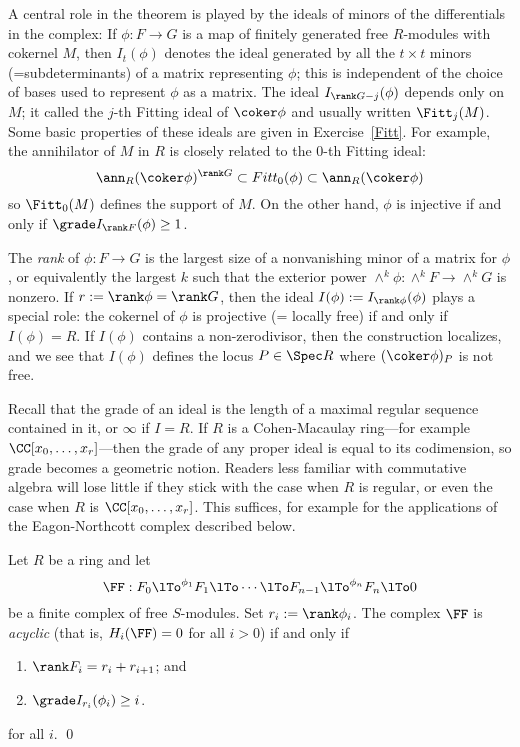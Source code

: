 A central role in the theorem is played by the ideals of minors of the differentials in the complex: If $\phi: F\to G$ is a map of finitely generated free $R$-modules with cokernel $M$, then
$I_t(\phi)$ denotes the ideal generated by all the $t\times t$ minors (=subdeterminants) of a matrix representing $\phi$; this is independent of the choice of bases used to represent $\phi$ as a matrix.
The ideal $I_{\rank G -j}(\phi)$ depends only on $M$; it called the $j$-th Fitting ideal of $\coker \phi$  and 
usually written $\Fitt_{j}(M)$. Some basic properties of these ideals are
given in Exercise~\ref{Fitt}. For example, the annihilator of $M$ in $R$
is closely related to the 0-th Fitting ideal:
$$
\ann_{R}(\coker \phi)^{\rank G}\subset Fitt_{0}(\phi) \subset \ann_{R}(\coker \phi)
$$
so $\Fitt_{0}(M)$ defines the support of $M$. On the other hand, $\phi$ is injective
if and only if $\grade I_{\rank F}(\phi) \geq 1$.

The \emph{rank} of $\phi: F\to G$ is the largest size of a nonvanishing minor of a matrix for $\phi$,
or equivalently the largest $k$ such that the exterior power $\wedge^{k}\phi : \wedge^{k}F \to \wedge^{k}G$
is nonzero. If $r:= \rank \phi = \rank G$, then the ideal $I(\phi): = I_{\rank \phi}(\phi)$ plays a special role: the cokernel of $\phi$
is projective (= locally free) if and only if $I(\phi) = R$. If $I(\phi)$ contains a non-zerodivisor, then
the construction localizes, and we see that $I(\phi)$ defines the locus  $P\in \Spec R$ where $(\coker \phi)_{P}$
is not free. 


Recall that the grade of an ideal is the length of a maximal regular sequence
contained in it, or $\infty$ if $I=R$. If $R$ is a Cohen-Macaulay ring---for example $\CC[x_{0},\dots, x_{r}]$---then the grade of any proper ideal is equal to its codimension, so grade becomes a geometric notion.
Readers less familiar with commutative algebra will lose little if they stick with the case when $R$ is
regular, or even the case when $R$ is $\CC[x_{0},\dots, x_{r}]$. This suffices, for example for the applications
of the Eagon-Northcott complex described below.


\begin{theorem}\label{WMACE}
 Let $R$ be a ring and let
 $$ 
\FF:  F_0\lTo^{\phi_1}F_1 \lTo \cdots \lTo F_{n-1}\lTo^{\phi_n} F_n\lTo 0
 $$
be a finite complex of free $S$-modules. Set $r_i := \rank \phi_i$. 
The complex $\FF$ is \emph{acyclic} (that is, $H_i(\FF) = 0$ for all $i>0$) if and only if
\begin{enumerate}
 \item $\rank F_i = r_i+r_{i+1}$; and
 \item $\grade I_{r_{i}}(\phi_i) \geq i$.
\end{enumerate}
for all $i$.
\qed
\end{theorem}

